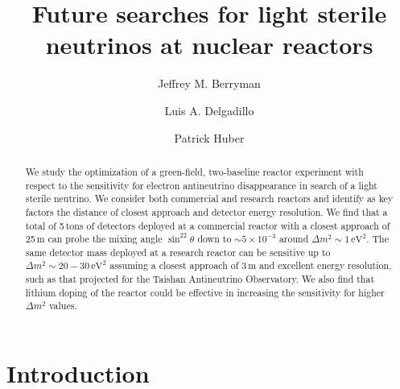 \documentclass[prd, twocolumn, tightenlines, twoside, secnumarabic, superscriptaddress, preprintnumbers, nofootinbib, notitlepage]{revtex4-1}
\begin{document}
\singlespacing
\allowdisplaybreaks

\title{Future searches for light sterile neutrinos at nuclear reactors}

\author{Jeffrey M. Berryman}


\author{Luis A. Delgadillo}

\author{Patrick Huber}




\begin{abstract}
We study the optimization of a green-field, two-baseline reactor experiment with respect to the sensitivity for electron antineutrino disappearance in search of a light sterile neutrino. We consider both commercial and research reactors and identify as key factors the distance of closest approach and detector energy resolution. We find that a total of 5\,tons of detectors deployed at a commercial reactor with a closest approach of 25\,m can probe the mixing angle $\sin^22\theta$ down to $\sim5\times10^{-3}$ around $\Delta m^2\sim 1\,\mathrm{eV}^2$. The same detector mass deployed at a research reactor can be sensitive up to  $\Delta m^2\sim20-30\,\mathrm{eV}^2$ assuming a closest approach of 3\,m and excellent energy resolution, such as that projected for the Taishan Antineutrino Observatory. We also find that lithium doping of the reactor could be effective in increasing the sensitivity for higher $\Delta m^2$ values.
\end{abstract}


\maketitle

\section{Introduction}
\label{sec:intro}
\setcounter{equation}{0}
\end{document}

